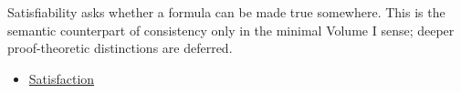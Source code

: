 \begin{remark*}[Interpretation]
Satisfiability asks whether a formula can be made true somewhere. This is the
semantic counterpart of consistency only in the minimal Volume I sense; deeper
proof-theoretic distinctions are deferred.
\end{remark*}

\begin{dependencies}
\begin{itemize}
  \item \hyperref[def:fol-satisfaction]{Satisfaction}
\end{itemize}
\end{dependencies}
